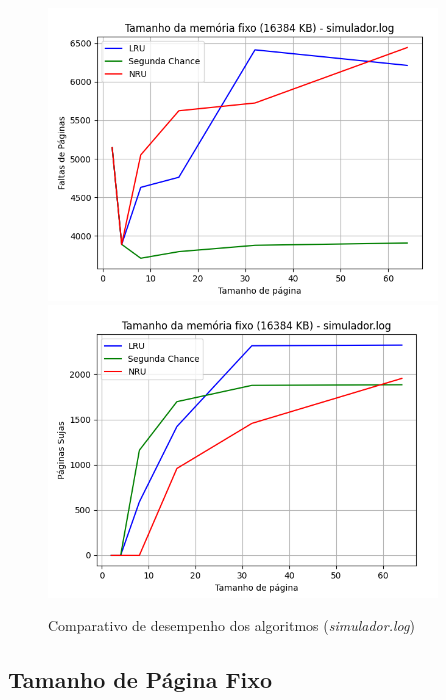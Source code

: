 \documentclass[a4paper, 12pt]{article}
\begin{document}
\begin{figure}[H]
    \centering
    \includegraphics[width=0.92\textwidth]{fixed_mem/simulador/fault.png}
    \hspace{1.5cm}
    \includegraphics[width=0.92\textwidth]{fixed_mem/simulador/write.png}
    \caption{Comparativo de desempenho dos algoritmos (\emph{simulador.log})}
    \label{fig:exampleFig4}
\end{figure}

\subsection{Tamanho de Página Fixo}
\end{document}

